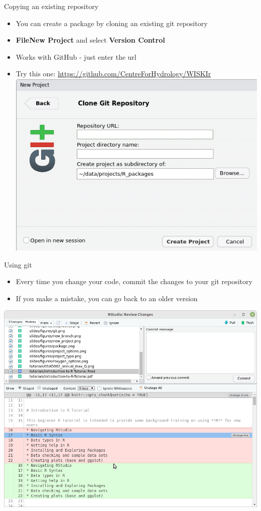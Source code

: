 \documentclass[
  ignorenonframetext,
  aspectratio=169]{beamer}
\providecommand{\tightlist}{%
  \setlength{\itemsep}{0pt}\setlength{\parskip}{0pt}}
\begin{document}
\begin{frame}{Copying an existing repository}
\protect\hypertarget{copying-an-existing-repository}{}
\begin{itemize}
\tightlist
\item
  You can create a package by cloning an existing git repository
\item
  \textbf{File\textbar New Project} and select \textbf{Version Control}
\item
  Works with GitHub - just enter the url
\item
  Try this one: \url{https://github.com/CentreForHydrology/WISKIr}
  \includegraphics{figures/git.png}
\end{itemize}
\end{frame}

\begin{frame}{Using git}
\protect\hypertarget{using-git}{}
\begin{itemize}
\tightlist
\item
  Every time you change your code, commit the changes to your git
  repository
\item
  If you make a mistake, you can go back to an older version
\end{itemize}

\includegraphics{figures/commit.png}
\end{frame}
\end{document}
